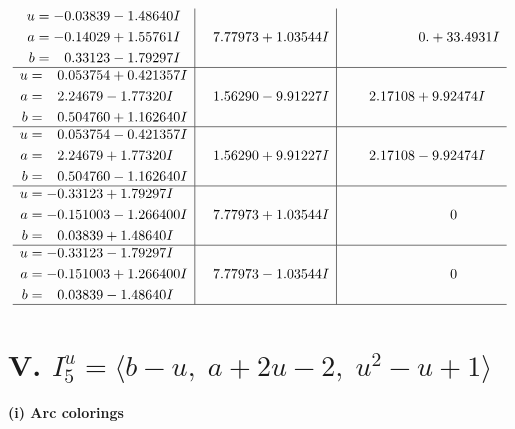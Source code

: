 \documentclass[1p]{elsarticle_modified}
\theoremstyle{definition}
\begin{document}
$$\begin{array}{c|c|c}
\begin{aligned}
u &= -0.03839 - 1.48640 I \\
a &= -0.14029 + 1.55761 I \\
b &= \phantom{-}0.33123 - 1.79297 I\end{aligned}
 & \phantom{-}7.77973 + 1.03544 I & \phantom{-0.000000 -}0. + 33.4931 I \\ \hline\begin{aligned}
u &= \phantom{-}0.053754 + 0.421357 I \\
a &= \phantom{-}2.24679 - 1.77320 I \\
b &= \phantom{-}0.504760 + 1.162640 I\end{aligned}
 & \phantom{-}1.56290 - 9.91227 I & \phantom{-}2.17108 + 9.92474 I \\ \hline\begin{aligned}
u &= \phantom{-}0.053754 - 0.421357 I \\
a &= \phantom{-}2.24679 + 1.77320 I \\
b &= \phantom{-}0.504760 - 1.162640 I\end{aligned}
 & \phantom{-}1.56290 + 9.91227 I & \phantom{-}2.17108 - 9.92474 I \\ \hline\begin{aligned}
u &= -0.33123 + 1.79297 I \\
a &= -0.151003 - 1.266400 I \\
b &= \phantom{-}0.03839 + 1.48640 I\end{aligned}
 & \phantom{-}7.77973 + 1.03544 I & \phantom{-0.000000 } 0 \\ \hline\begin{aligned}
u &= -0.33123 - 1.79297 I \\
a &= -0.151003 + 1.266400 I \\
b &= \phantom{-}0.03839 - 1.48640 I\end{aligned}
 & \phantom{-}7.77973 - 1.03544 I & \phantom{-0.000000 } 0\\
 \hline 
 \end{array}$$\newpage\newpage\renewcommand{\arraystretch}{1}
\centering \section*{V. $I^u_{5}= \langle b- u,\;a+2 u-2,\;u^2- u+1 \rangle$}
\flushleft \textbf{(i) Arc colorings}\\
\end{document}
